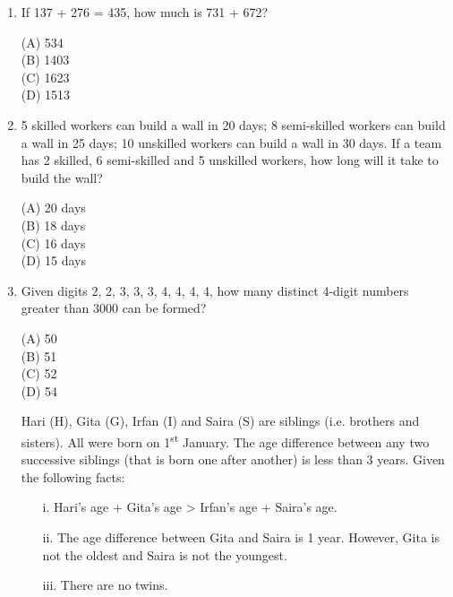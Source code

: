 \documentclass[journal,12pt,onecolumn]{exam}
\theoremstyle{remark}
\begin{document}
\begin{enumerate}
\noindent\item If 137 + 276 = 435, how much is 731 + 672?

\hfill{}

\begin{multicols}{4}
\noindent(A) 534\\
(B) 1403\\
(C) 1623\\
(D) 1513
\end{multicols}

\setlength{\parskip}{0.5cm}

\noindent\item 5 skilled workers can build a wall in 20 days; 8 semi-skilled workers can build a wall in 25 days; 10 unskilled workers can build a wall in 30 days. If a team has 2 skilled, 6 semi-skilled and 5 unskilled workers, how long will it take to build the wall?

\hfill{}

\begin{multicols}{4}
\noindent(A) 20 days\\
(B) 18 days\\
(C) 16 days\\
(D) 15 days
\end{multicols}

\setlength{\parskip}{0.5cm}

\noindent\item Given digits 2, 2, 3, 3, 3, 4, 4, 4, 4, how many distinct 4-digit numbers greater than 3000 can be formed?

\hfill{}

\begin{multicols}{4}
\noindent(A) 50\\
(B) 51\\
(C) 52\\
(D) 54
\end{multicols}


\noindent Hari (H), Gita (G), Irfan (I) and Saira (S) are siblings (i.e. brothers and sisters). All were born on 1\textsuperscript{st} January. The age difference between any two successive siblings (that is born one after another) is less than 3 years. Given the following facts:

\begin{itemize}
  \item[i.] Hari’s age + Gita’s age > Irfan’s age + Saira’s age.
  \item[ii.] The age difference between Gita and Saira is 1 year. However, Gita is not the oldest and Saira is not the youngest.
  \item[iii.] There are no twins.
\end{itemize}


\end{enumerate}
\end{document}
